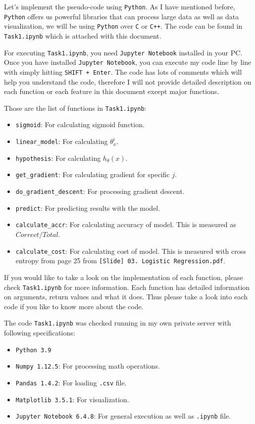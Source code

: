 \documentclass{homework}
\begin{document}
Let's implement the pseudo-code using \texttt{Python}. As I have mentioned before, \texttt{Python} offers us powerful libraries that can process large data as well as data visualization, we will be using \texttt{Python} over \texttt{C} or \texttt{C++}. The code can be found in \texttt{Task1.ipynb} which is attached with this document.

For executing \texttt{Task1.ipynb}, you need \texttt{Jupyter Notebook} installed in your PC. Once you have installed \texttt{Jupyter Notebook}, you can execute my code line by line with simply hitting \texttt{SHIFT + Enter}. The code has lots of comments which will help you understand the code, therefore I will not provide detailed description on each function or each feature in this document except major functions.

Those are the list of functions in \texttt{Task1.ipynb}:

\begin{itemize}
  \item \texttt{sigmoid}: For calculating sigmoid function.
  \item \texttt{linear_model}: For calculating $\theta_x^i$.
  \item \texttt{hypothesis}: For calculating $h_\theta(x)$.
  \item \texttt{get_gradient}: For calculating gradient for specific $j$.
  \item \texttt{do_gradient_descent}: For processing gradient descent.
  \item \texttt{predict}: For predicting results with the model.
  \item \texttt{calculate_accr}: For calculating accuracy of model. This is measured as $Correct / Total$.
  \item \texttt{calculate_cost}: For calculating cost of model. This is measured with cross entropy from page 25 from \texttt{[Slide] 03. Logistic Regression.pdf}.
\end{itemize}
If you would like to take a look on the implementation of each function, please check \texttt{Task1.ipynb} for more information. Each function has detailed information on arguments, return values and what it does. Thus please take a look into each code if you like to know more about the code. 

The code \texttt{Task1.ipynb} was checked running in my own private server with following specifications:

\begin{itemize}
  \item \texttt{Python 3.9}
  \item \texttt{Numpy 1.12.5}: For processing math operations.
  \item \texttt{Pandas 1.4.2}: For loading \texttt{.csv} file.
  \item \texttt{Matplotlib 3.5.1}: For visualization.
  \item \texttt{Jupyter Notebook 6.4.8}: For general execution as well as \texttt{.ipynb} file.
\end{itemize}
\end{document}
